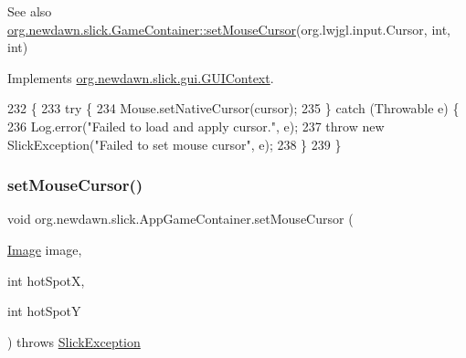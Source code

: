 \begin{DoxySeeAlso}{See also}
\mbox{\hyperlink{classorg_1_1newdawn_1_1slick_1_1_game_container_a13e789e67755f14bad1caf70e3bd6d4e}{org.\+newdawn.\+slick.\+Game\+Container\+::set\+Mouse\+Cursor}}(org.\+lwjgl.\+input.\+Cursor, int, int) 
\end{DoxySeeAlso}


Implements \mbox{\hyperlink{interfaceorg_1_1newdawn_1_1slick_1_1gui_1_1_g_u_i_context_a659a53b877f78b793fe3e6206c7c4a0c}{org.\+newdawn.\+slick.\+gui.\+G\+U\+I\+Context}}.


\begin{DoxyCode}
232                                                                                                 \{
233         \textcolor{keywordflow}{try} \{
234             Mouse.setNativeCursor(cursor);
235         \} \textcolor{keywordflow}{catch} (Throwable e) \{
236             Log.error(\textcolor{stringliteral}{"Failed to load and apply cursor."}, e);
237             \textcolor{keywordflow}{throw} \textcolor{keyword}{new} SlickException(\textcolor{stringliteral}{"Failed to set mouse cursor"}, e);
238         \}
239     \}
\end{DoxyCode}
\mbox{\label{classorg_1_1newdawn_1_1slick_1_1_app_game_container_a714758b8650cd08fd982b81d29a173a0}} 
\subsubsection{\texorpdfstring{set\+Mouse\+Cursor()}{setMouseCursor()}\hspace{0.1cm}{\footnotesize\ttfamily [4/4]}}
{\footnotesize\ttfamily void org.\+newdawn.\+slick.\+App\+Game\+Container.\+set\+Mouse\+Cursor (\begin{DoxyParamCaption}\item[{\mbox{\hyperlink{classorg_1_1newdawn_1_1slick_1_1_image}{Image}}}]{image,  }\item[{int}]{hot\+SpotX,  }\item[{int}]{hot\+SpotY }\end{DoxyParamCaption}) throws \mbox{\hyperlink{classorg_1_1newdawn_1_1slick_1_1_slick_exception}{Slick\+Exception}}\hspace{0.3cm}{\ttfamily [inline]}}

